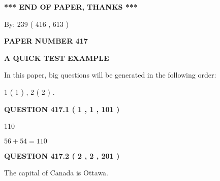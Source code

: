 \documentclass[12pt]{article}
\begin{document}
   
   
\vspace{1.0in} 
{\textbf{\large{ *** END OF PAPER, THANKS *** }}} 
   
   
\hspace{1.0in} By: 
 239 ( 416 ,  613 )
   
   
   
   
\newpage 
\setcounter{page}{ 
   417001 } 
   
   
   
   
 {\textbf{ \Large{ PAPER NUMBER  417  }}}
   
   
\vspace{0.2in}
   
   
   
   
   
   
 \vspace{0.2in}
{\LARGE {\textbf{ A QUICK TEST EXAMPLE}}}
   
   
   
\vspace{0.2in}
   
In this paper, big questions will be generated in the following order: 
   
   
   1 ( 1 )
 ,
   2 ( 2 )
 .
  
\vspace{0.2in}
  
{\textbf{\Large{QUESTION
417.1 
 ( 1 , 1 , 101 )
}}}
  
  
 
 
\noindent{}

110
 
 
 
 
\noindent{}

$ %
56 +  %
54=   %
110$
 
 
  
\vspace{0.2in}
  
{\textbf{\Large{QUESTION
417.2 
 ( 2 , 2 , 201 )
}}}
  
  
 
 
\noindent{}
 
 
The capital of Canada is Ottawa.
 
\end{document}
